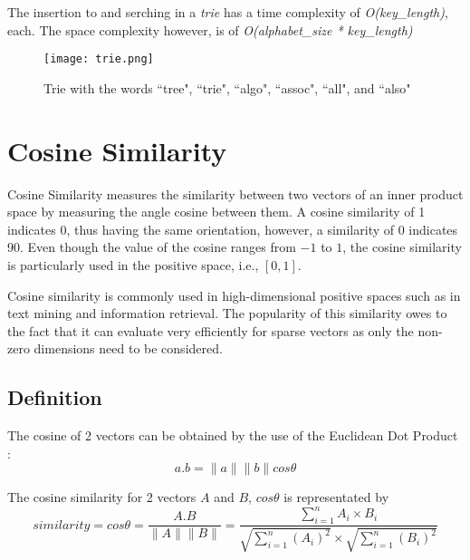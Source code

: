 		The insertion to and serching in a \emph{trie} has a time complexity of \emph{O(key\_length)}, each. The space complexity however, is of \emph{O(alphabet\_size * key\_length)}
		
		\begin{figure}[ht!]
			\centering
			\texttt{[image: trie.png]}
			\caption{Trie with the words ``tree", ``trie", ``algo", ``assoc", ``all", and ``also" \label{trie}}
		\end{figure}
	
	\section{Cosine Similarity}	
	\label{sec:cosine_similarity}
		Cosine Similarity \cite{singhal2001modern} measures the similarity between two vectors of an inner product space by measuring the angle cosine between them. A cosine similarity of 1 indicates 0\textdegree, thus having the same orientation, however, a similarity of 0 indicates 90\textdegree. Even though the value of the cosine ranges from \(-1\) to \(1\), the cosine similarity is particularly used in the positive space, i.e., \([0,1]\).
		
		Cosine similarity is commonly used in high-dimensional positive spaces such as in text mining and information retrieval. The popularity of this similarity owes to the fact that it can evaluate very efficiently for sparse vectors as only the non-zero dimensions need to be considered.
		
		\subsection{Definition}
			The cosine of 2 vectors can be obtained by the use of the Euclidean Dot Product \cite{singhal2001modern}:
			\[ a . b = \|a\| \|b\| cos \theta \]
			
			The cosine similarity for 2 vectors \(A\) and \(B\), \(cos \theta \) is representated by
			\[ similarity = cos \theta = \frac{A.B}{\|A\|\|B\|} = \frac{\displaystyle\sum_{i=1}^{n} A_i \times B_i}{\sqrt{\displaystyle\sum_{i=1}^{n} (A_i) ^ 2} \times \sqrt{\displaystyle\sum_{i=1}^{n} (B_i) ^ 2}} \]